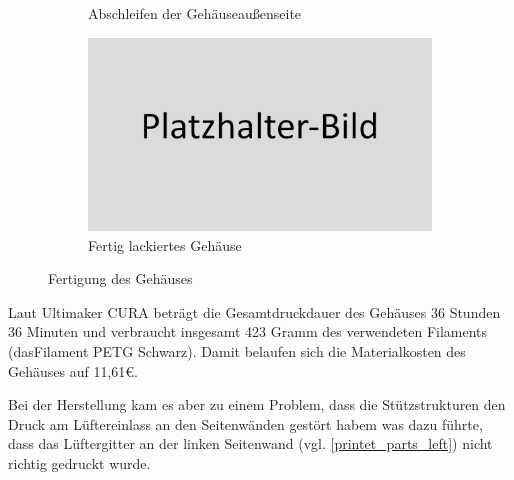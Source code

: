\begin{figure}[h!tb]
\begin{subfigure}[b]{0.5\linewidth}
		\caption[Abschleifen der Gehäuseaußenseite]{Abschleifen der Gehäuseaußenseite}
		\label{fig:filed_parts}
	\end{subfigure}
	\begin{subfigure}[b]{0.5\linewidth}
		\centering
		\includegraphics[width=1\textwidth]{img/placeholder.png}
		\caption[Fertig lackiertes Gehäuse]{Fertig lackiertes Gehäuse}
		\label{fig:finished_parts}
	\end{subfigure}
	\caption[Fertigung des Gehäuses]{Fertigung des Gehäuses}
	\label{fig:creating-case}
\end{figure}\par
Laut Ultimaker CURA beträgt die Gesamtdruckdauer des Gehäuses 36 Stunden 36 Minuten und verbraucht insgesamt 423 Gramm des verwendeten Filaments (dasFilament PETG Schwarz). 
Damit belaufen sich die Materialkosten des Gehäuses auf 11,61\euro{}.\par
\noindent Bei der Herstellung kam es aber zu einem Problem, dass die Stützstrukturen den Druck am Lüftereinlass an den Seitenwänden gestört habem was dazu führte, dass das Lüftergitter an der  linken Seitenwand (vgl. \ref{printet_parts_left}) nicht richtig gedruckt wurde.